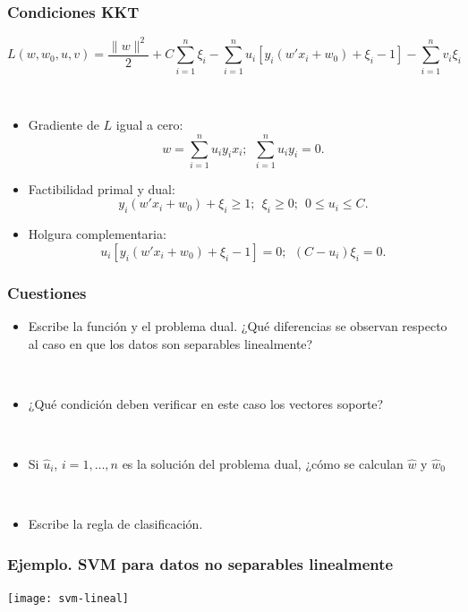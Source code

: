 \documentclass[dvipsnames, pdflatex,slidecentered]{beamer}
\begin{document}
\begin{frame}[plain]
\frametitle{Condiciones KKT}



\[
L(w,w_0,u,v) = \frac{\|w\|^2}{2} +C\sum_{i=1}^n \xi_i - \sum_{i=1}^n u_i[y_i(w'x_i+w_0)+\xi_i-1] - \sum_{i=1}^n v_i\xi_i
\]

\

\begin{itemize}
\item Gradiente de $L$ igual a cero:
\[
 w = \sum_{i=1}^n  u_i y_i x_i;\ \  \sum_{i=1}^n u_i y_i=0.
\]

\item Factibilidad primal y dual:
\[
y_i(w' x_i + w_0) + \xi_i\geq 1;\ \ \xi_i\geq 0;\ \ 0\leq u_i\leq C.
\]

\item Holgura complementaria: 
\[
u_i[y_i(w' x_i + w_0) + \xi_i - 1]=0;\  \ (C-u_i)\xi_i =0.
\]
\end{itemize}




\end{frame}
\begin{frame}[plain]
\frametitle{Cuestiones}

\begin{itemize}
\item Escribe la función y el problema dual. ¿Qué diferencias se observan respecto al caso en que los datos son separables linealmente?

\

\item ¿Qué condición deben verificar en este caso los vectores soporte?

\

\item Si $\hat u_i$, $i=1,\ldots, n$ es la solución del problema dual, ¿cómo se calculan $\hat w$ y $\hat w_0$

\

\item Escribe la regla de clasificación.

\end{itemize}

\end{frame}
\begin{frame}[plain]
\frametitle{Ejemplo. SVM para datos no separables linealmente}

\begin{center}
\texttt{[image: svm-lineal]}
\end{center}


\end{frame}
\end{document}
